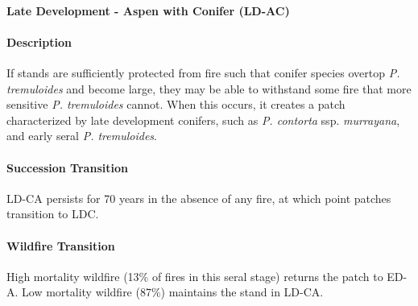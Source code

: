 \noindent\hrulefill


\paragraph{Late Development - Aspen with Conifer (LD-AC)}

\paragraph{Description} If stands are sufficiently protected from fire such that conifer species overtop \emph{P. tremuloides} and become large, they may be able to withstand some fire that more sensitive \emph{P. tremuloides} cannot. When this occurs, it creates a patch characterized by late development conifers, such as \emph{P. contorta} ssp. \emph{murrayana}, and early seral \emph{P. tremuloides}. 

\paragraph{Succession Transition} LD-CA persists for 70 years in the absence of any fire, at which point patches transition to LDC. 

\paragraph{Wildfire Transition} High mortality wildfire (13\% of fires in this seral stage) returns the patch to ED-A. Low mortality wildfire (87\%) maintains the stand in LD-CA. 

\noindent\hrulefill




